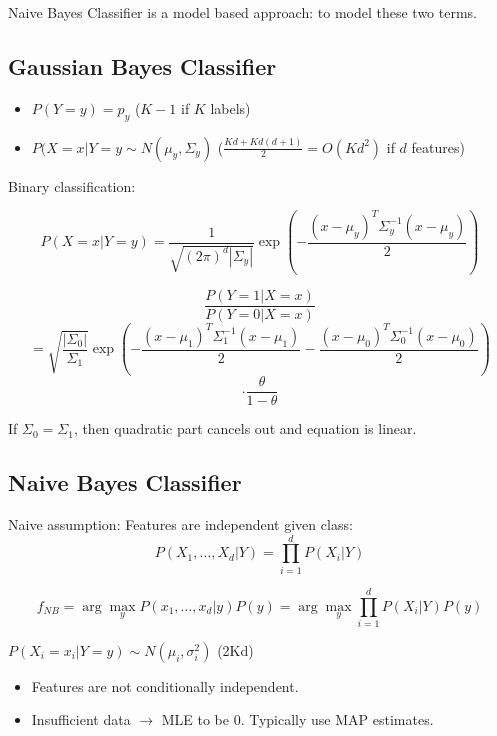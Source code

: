 \documentclass[letterpaper, 10pt, twocolumn]{article}
\begin{document}
Naive Bayes Classifier is a model based approach: to model these two terms.

\subsection{Gaussian Bayes Classifier}

\begin{itemize}
	\item $P(Y=y)=p_y$ ($K-1$ if $K$ labels)
	\item $P(X=x|Y=y \sim N(\mu_y,\Sigma_y)$ ($\frac{Kd+Kd(d+1)}{2}=O(Kd^2)$ if $d$ features)
\end{itemize}

Binary classification:

$$P(X=x|Y=y) = \frac{1}{\sqrt{(2\pi)^d|\Sigma_y|}}\exp(-\frac{(x-\mu_y)^T\Sigma_y^{-1}(x-\mu_y)}{2})$$

$$\frac{P(Y=1|X=x)}{P(Y=0|X=x)}$$
$$=\sqrt{\frac{|\Sigma_0|}{\Sigma_1}}\exp(-\frac{(x-\mu_1)^T\Sigma_1^{-1}(x-\mu_1)}{2}-\frac{(x-\mu_0)^T\Sigma_0^{-1}(x-\mu_0)}{2})$$
$$\cdot\frac{\theta}{1-\theta}$$

If $\Sigma_0=\Sigma_1$, then quadratic part cancels out and equation is linear.

\subsection{Naive Bayes Classifier}

Naive assumption: Features are independent given class:
$$P(X_1,\dots,X_d|Y)=\prod_{i=1}^{d}P(X_i|Y)$$

$$f_{NB}=\arg\max_y P(x_1,\dots,x_d|y)P(y)=\arg\max_y \prod_{i=1}^{d}P(X_i|Y)P(y)$$

$P(X_i=x_i|Y=y) \sim N(\mu_i,\sigma_i^2)$ (2Kd)

\begin{itemize}
	\item Features are not conditionally independent.
	\item Insufficient data $\rightarrow$ MLE to be 0. Typically use MAP estimates.
\end{itemize}
\end{document}
